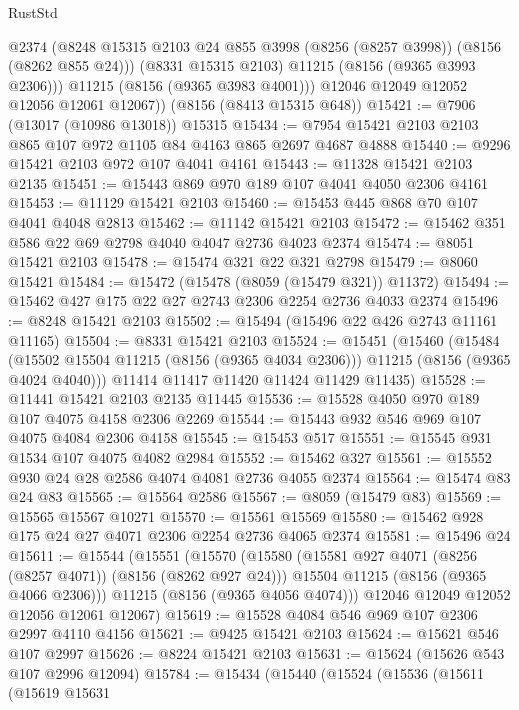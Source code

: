 \begin{lexlean}{RustStd}
\begin{coremodule}
            @2374
            (@8248 @15315 @2103 @24 @855 @3998 (@8256 (@8257 @3998)) (@8156 (@8262 @855 @24)))
            (@8331 @15315 @2103)
            @11215
            (@8156 (@9365 @3993 @2306)))
          @11215
          (@8156 (@9365 @3983 @4001)))
        @12046
        @12049
        @12052
        @12056
        @12061
        @12067))
    (@8156 (@8413 @15315 @648))
@15421 := @7906 (@13017 (@10986 @13018)) @15315
@15434 := @7954 @15421 @2103 @2103 @865 @107 @972 @1105 @84 @4163 @865 @2697 @4687 @4888
@15440 := @9296 @15421 @2103 @972 @107 @4041 @4161
@15443 := @11328 @15421 @2103 @2135
@15451 := @15443 @869 @970 @189 @107 @4041 @4050 @2306 @4161
@15453 := @11129 @15421 @2103
@15460 := @15453 @445 @868 @70 @107 @4041 @4048 @2813
@15462 := @11142 @15421 @2103
@15472 := @15462 @351 @586 @22 @69 @2798 @4040 @4047 @2736 @4023 @2374
@15474 := @8051 @15421 @2103
@15478 := @15474 @321 @22 @321 @2798
@15479 := @8060 @15421
@15484 := @15472 (@15478 (@8059 (@15479 @321)) @11372)
@15494 := @15462 @427 @175 @22 @27 @2743 @2306 @2254 @2736 @4033 @2374
@15496 := @8248 @15421 @2103
@15502 := @15494 (@15496 @22 @426 @2743 @11161 @11165)
@15504 := @8331 @15421 @2103
@15524 := @15451
    (@15460
      (@15484 (@15502 @15504 @11215 (@8156 (@9365 @4034 @2306))) @11215 (@8156 (@9365 @4024 @4040)))
      @11414
      @11417
      @11420
      @11424
      @11429
      @11435)
@15528 := @11441 @15421 @2103 @2135 @11445
@15536 := @15528 @4050 @970 @189 @107 @4075 @4158 @2306 @2269
@15544 := @15443 @932 @546 @969 @107 @4075 @4084 @2306 @4158
@15545 := @15453 @517
@15551 := @15545 @931 @1534 @107 @4075 @4082 @2984
@15552 := @15462 @327
@15561 := @15552 @930 @24 @28 @2586 @4074 @4081 @2736 @4055 @2374
@15564 := @15474 @83 @24 @83
@15565 := @15564 @2586
@15567 := @8059 (@15479 @83)
@15569 := @15565 @15567 @10271
@15570 := @15561 @15569
@15580 := @15462 @928 @175 @24 @27 @4071 @2306 @2254 @2736 @4065 @2374
@15581 := @15496 @24
@15611 := @15544
    (@15551
      (@15570
        (@15580
          (@15581 @927 @4071 (@8256 (@8257 @4071)) (@8156 (@8262 @927 @24)))
          @15504
          @11215
          (@8156 (@9365 @4066 @2306)))
        @11215
        (@8156 (@9365 @4056 @4074)))
      @12046
      @12049
      @12052
      @12056
      @12061
      @12067)
@15619 := @15528 @4084 @546 @969 @107 @2306 @2997 @4110 @4156
@15621 := @9425 @15421 @2103
@15624 := @15621 @546 @107 @2997
@15626 := @8224 @15421 @2103
@15631 := @15624 (@15626 @543 @107 @2996 @12094)
@15784 := @15434
    (@15440
      (@15524
        (@15536
          (@15611
            (@15619
              @15631

\end{coremodule}
\end{lexlean}
